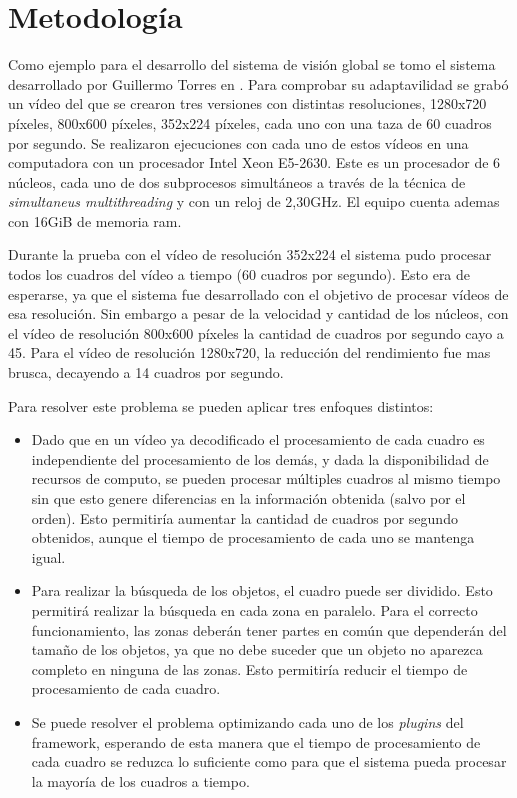 
\section{Metodología}

Como ejemplo para el desarrollo del sistema de visión global se tomo el sistema
desarrollado por Guillermo Torres en \cite{torres2014}. Para comprobar su
adaptavilidad se grabó un vídeo del que se crearon tres versiones con distintas
resoluciones, 1280x720 píxeles, 800x600 píxeles, 352x224 píxeles, cada uno con
una taza de 60 cuadros por segundo. Se realizaron ejecuciones con cada uno de
estos vídeos en una computadora con un procesador Intel Xeon E5-2630. Este es un
procesador de 6 núcleos, cada uno de dos subprocesos simultáneos a través de la
técnica de \emph{simultaneus multithreading} y con un reloj de 2,30GHz. El
equipo cuenta ademas con 16GiB de memoria ram.

Durante la prueba con el vídeo de resolución 352x224 el sistema pudo procesar
todos los cuadros del vídeo a tiempo (60 cuadros por segundo). Esto era de
esperarse, ya que el sistema fue desarrollado con el objetivo de procesar vídeos
de esa resolución. Sin embargo a pesar de la velocidad y cantidad de los
núcleos, con el vídeo de resolución 800x600 píxeles la cantidad de cuadros por
segundo cayo a 45. Para el vídeo de resolución 1280x720, la reducción del
rendimiento fue mas brusca, decayendo a 14 cuadros por segundo.

Para resolver este problema se pueden aplicar tres enfoques distintos:

\begin{itemize}

\item 	Dado que en un vídeo ya decodificado el procesamiento de cada cuadro es
	independiente del procesamiento de los demás, y dada la disponibilidad
	de recursos de computo, se pueden procesar múltiples cuadros al mismo
	tiempo sin que esto genere diferencias en la información obtenida (salvo
	por el orden). Esto permitiría aumentar la cantidad de cuadros por
	segundo obtenidos, aunque el tiempo de procesamiento de cada uno se
	mantenga igual.

\item	Para realizar la búsqueda de los objetos, el cuadro puede ser dividido.
	Esto permitirá realizar la búsqueda en cada zona en paralelo. Para el
	correcto funcionamiento, las zonas deberán tener partes en común que
	dependerán del tamaño de los objetos, ya que no debe suceder que un
	objeto no aparezca completo en ninguna de las zonas. Esto permitiría
	reducir el tiempo de procesamiento de cada cuadro.

\item	Se puede resolver el problema optimizando cada uno de los \emph{plugins}
	del framework, esperando de esta manera que el tiempo de procesamiento
	de cada cuadro se reduzca lo suficiente como para que el sistema pueda
	procesar la mayoría de los cuadros a tiempo.

\end{itemize}

